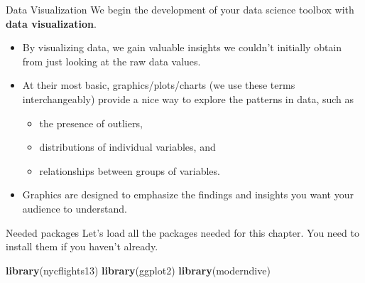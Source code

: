 \documentclass[
  ignorenonframetext,
]{beamer}
\newenvironment{Shaded}{\begin{snugshade}}{\end{snugshade}}
\newcommand{\FunctionTok}[1]{\textcolor[rgb]{0.13,0.29,0.53}{\textbf{#1}}}
\newcommand{\NormalTok}[1]{#1}
\providecommand{\tightlist}{%
  \setlength{\itemsep}{0pt}\setlength{\parskip}{0pt}}
\begin{document}
\begin{frame}{Data Visualization}
\protect\hypertarget{data-visualization-1}{}
We begin the development of your data science toolbox with \textbf{data
visualization}.

\begin{itemize}
\item
  By visualizing data, we gain valuable insights we couldn't initially
  obtain from just looking at the raw data values.
\item
  At their most basic, graphics/plots/charts (we use these terms
  interchangeably) provide a nice way to explore the patterns in data,
  such as

  \begin{itemize}
  \tightlist
  \item
    the presence of outliers,
  \item
    distributions of individual variables, and
  \item
    relationships between groups of variables.
  \end{itemize}
\item
  Graphics are designed to emphasize the findings and insights you want
  your audience to understand.
\end{itemize}
\end{frame}

\begin{frame}[fragile]{Needed packages}
\protect\hypertarget{needed-packages}{}
Let's load all the packages needed for this chapter. You need to install
them if you haven't already.

\small

\begin{Shaded}
\begin{Highlighting}[]
\FunctionTok{library}\NormalTok{(nycflights13)}
\FunctionTok{library}\NormalTok{(ggplot2)}
\FunctionTok{library}\NormalTok{(moderndive)}
\end{Highlighting}
\end{Shaded}

\normalsize
\end{frame}
\end{document}
